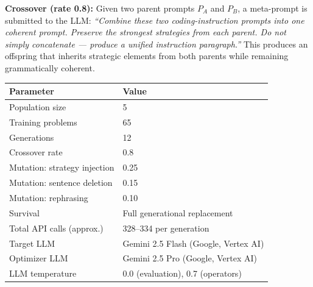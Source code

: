 \textbf{Crossover (rate 0.8):} Given two parent prompts $P_A$ and $P_B$, a meta-prompt is
submitted to the LLM: \textit{``Combine these two coding-instruction prompts into one
coherent prompt. Preserve the strongest strategies from each parent. Do not simply
concatenate --- produce a unified instruction paragraph.''} This produces an offspring
that inherits strategic elements from both parents while remaining grammatically coherent.



\begin{tabular}{ll}
\toprule
\textbf{Parameter} & \textbf{Value} \\
\midrule
Population size & 5 \\
Training problems & 65 \\
Generations & 12 \\
Crossover rate & 0.8 \\
Mutation: strategy injection & 0.25 \\
Mutation: sentence deletion & 0.15 \\
Mutation: rephrasing & 0.10 \\
Survival & Full generational replacement \\
Total API calls (approx.) & 328--334 per generation \\
Target LLM & Gemini 2.5 Flash (Google, Vertex AI) \\
Optimizer LLM & Gemini 2.5 Pro (Google, Vertex AI) \\
LLM temperature & 0.0 (evaluation), 0.7 (operators) \\
\bottomrule
\end{tabular}



